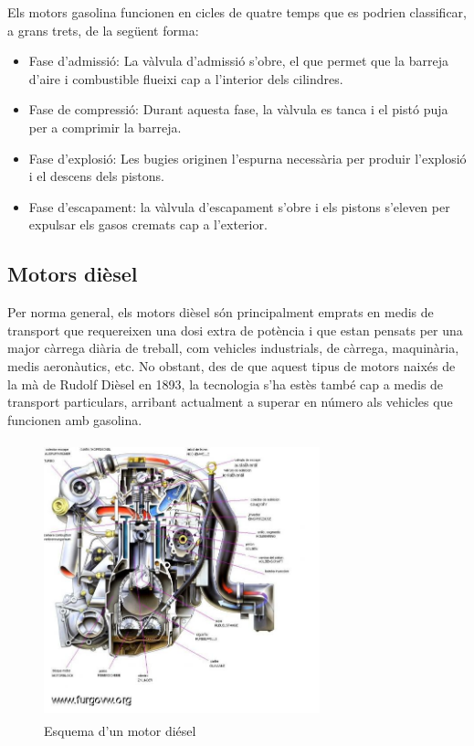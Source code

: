 Els motors gasolina funcionen en cicles de quatre temps que es podrien classificar, a grans trets, de la següent forma:

\begin{itemize}
  \item Fase d’admissió: La vàlvula d’admissió s’obre, el que permet que la barreja d’aire i combustible flueixi cap a l’interior dels cilindres.
  \item Fase de compressió: Durant aquesta fase, la vàlvula es tanca i el pistó puja per a comprimir la barreja.
  \item Fase d’explosió: Les bugies originen l’espurna necessària per produir l’explosió i el descens dels pistons.
  \item Fase d’escapament: la vàlvula d’escapament s’obre i els pistons \newline s’eleven per expulsar els gasos cremats cap a l’exterior.
\end{itemize}

\subsection{Motors dièsel}
Per norma general, els motors dièsel són principalment emprats en medis de transport que requereixen una dosi extra de potència i que estan pensats per una major càrrega diària de treball, com vehicles industrials, de càrrega, maquinària, medis aeronàutics, etc.
No obstant, des de que aquest tipus de motors naixés de la mà de Rudolf Dièsel en 1893, la tecnologia s’ha estès també cap a medis de transport particulars, arribant actualment a superar en número als vehicles que funcionen amb gasolina.

\begin{figure}[H]
		\centering
    	\includegraphics[width=8cm, height=8cm]{Motors/motordiesel.jpg}
     	\caption{Esquema d'un motor diésel} 
\end{figure}

